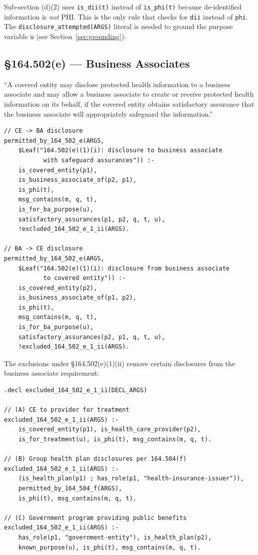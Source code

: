 \documentclass[11pt,letterpaper]{article}
\begin{document}
\begin{designbox}
Sub-section (d)(2) uses \texttt{is\_dii(t)} instead of \texttt{is\_phi(t)} because de-identified information is \emph{not} PHI. This is the only rule that checks for \texttt{dii} instead of \texttt{phi}. The \texttt{disclosure\_attempted(ARGS)} literal is needed to ground the purpose variable \texttt{u} (see Section~\ref{sec:grounding}).
\end{designbox}

\subsection{\S 164.502(e) --- Business Associates}
\label{sec:502e}

\begin{hipaabox}
``A covered entity may disclose protected health information to a business associate and may allow a business associate to create or receive protected health information on its behalf, if the covered entity obtains satisfactory assurance that the business associate will appropriately safeguard the information.''
\end{hipaabox}

\begin{lstlisting}[style=soufflestyle,caption={\S 164.502(e) --- business associates}]
// CE -> BA disclosure
permitted_by_164_502_e(ARGS,
    $Leaf("164.502(e)(1)(i): disclosure to business associate
           with safeguard assurances")) :-
    is_covered_entity(p1),
    is_business_associate_of(p2, p1),
    is_phi(t),
    msg_contains(m, q, t),
    is_for_ba_purpose(u),
    satisfactory_assurances(p1, p2, q, t, u),
    !excluded_164_502_e_1_ii(ARGS).

// BA -> CE disclosure
permitted_by_164_502_e(ARGS,
    $Leaf("164.502(e)(1)(i): disclosure from business associate
           to covered entity")) :-
    is_covered_entity(p2),
    is_business_associate_of(p1, p2),
    is_phi(t),
    msg_contains(m, q, t),
    is_for_ba_purpose(u),
    satisfactory_assurances(p2, p1, q, t, u),
    !excluded_164_502_e_1_ii(ARGS).
\end{lstlisting}

The exclusions under \S 164.502(e)(1)(ii) remove certain disclosures from the business associate requirement:

\begin{lstlisting}[style=soufflestyle,caption={\S 164.502(e)(1)(ii) --- exclusions}]
.decl excluded_164_502_e_1_ii(DECL_ARGS)

// (A) CE to provider for treatment
excluded_164_502_e_1_ii(ARGS) :-
    is_covered_entity(p1), is_health_care_provider(p2),
    is_for_treatment(u), is_phi(t), msg_contains(m, q, t).

// (B) Group health plan disclosures per 164.504(f)
excluded_164_502_e_1_ii(ARGS) :-
    (is_health_plan(p1) ; has_role(p1, "health-insurance-issuer")),
    permitted_by_164_504_f(ARGS),
    is_phi(t), msg_contains(m, q, t).

// (C) Government program providing public benefits
excluded_164_502_e_1_ii(ARGS) :-
    has_role(p1, "government-entity"), is_health_plan(p2),
    known_purpose(u), is_phi(t), msg_contains(m, q, t).
\end{lstlisting}
\end{document}
